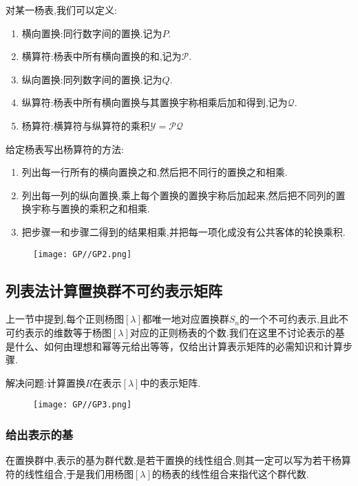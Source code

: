 \documentclass{ctexart}
\begin{document}
对某一杨表,我们可以定义:
\begin{enumerate}
    \item 横向置换:同行数字间的置换.记为$P$.
    \item 横算符:杨表中所有横向置换的和,记为$\mathcal{P}$.
    \item 纵向置换:同列数字间的置换.记为$Q$.
    \item 纵算符:杨表中所有横向置换与其置换宇称相乘后加和得到,记为$\mathcal{Q}$.
    \item 杨算符:横算符与纵算符的乘积$\mathcal{Y}=\mathcal{PQ}$
\end{enumerate}

给定杨表写出杨算符的方法:
\begin{enumerate}
    \item 列出每一行所有的横向置换之和,然后把不同行的置换之和相乘.
    \item 列出每一列的纵向置换,乘上每个置换的置换宇称后加起来,然后把不同列的置换宇称与置换的乘积之和相乘.
    \item 把步骤一和步骤二得到的结果相乘,并把每一项化成没有公共客体的轮换乘积.
\end{enumerate}
\begin{figure}[H]
    \centering
    \texttt{[image: GP//GP2.png]}
\end{figure}

\subsection{列表法计算置换群不可约表示矩阵}

上一节中提到,每个正则杨图$[\lambda]$都唯一地对应置换群$S_{n}$的一个不可约表示,且此不可约表示的维数等于杨图$[\lambda]$对应的正则杨表的个数.我们在这里不讨论表示的基是什么、如何由理想和幂等元给出等等，仅给出计算表示矩阵的必需知识和计算步骤.

解决问题:计算置换$R$在表示$[\lambda]$中的表示矩阵.

\begin{figure}[H]
    \centering
    \texttt{[image: GP//GP3.png]}
\end{figure}

\subsubsection{给出表示的基}

在置换群中,表示的基为群代数,是若干置换的线性组合,则其一定可以写为若干杨算符的线性组合,于是我们用杨图$[\lambda]$的杨表的线性组合来指代这个群代数.
\end{document}
